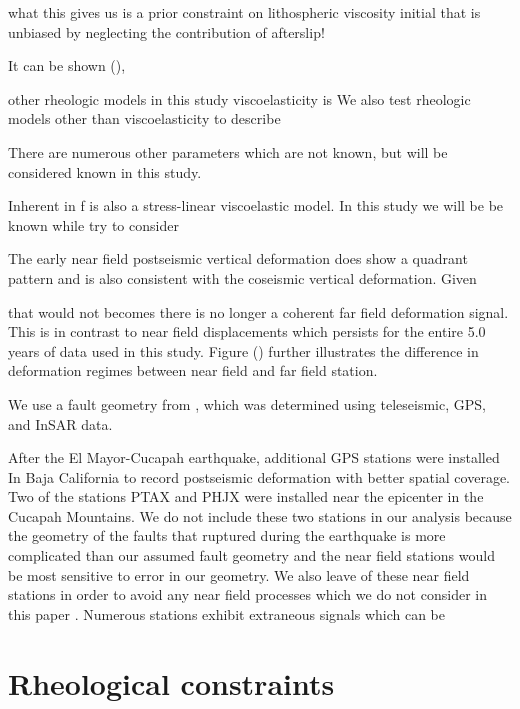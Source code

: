 \documentclass[12pt]{article}
\begin{document}
what this gives us is a prior constraint on lithospheric viscosity initial that is unbiased by neglecting the contribution of afterslip! 


It can be shown (\cite{Hines2015}),     

other rheologic models in this study      viscoelasticity is We also test rheologic models other than viscoelasticity to describe    




There are numerous other parameters which are not known, but will be considered known in this study.   


   Inherent in f is also a stress-linear viscoelastic model.   In this study we will be be known while try to consider             

    

   The early near field postseismic vertical deformation does show a quadrant pattern and is also consistent with the coseismic vertical deformation.  Given         

that would not becomes there is no longer a coherent far field deformation signal. This is in contrast to near field displacements which persists for the entire 5.0 years of data used in this study. Figure () further illustrates the difference in deformation regimes between near field and far field station.  



We use a fault geometry from \cite{Wei2011}, which was determined using teleseismic, GPS, and InSAR data.  

After the El Mayor-Cucapah earthquake, additional GPS stations were installed In Baja California to record postseismic deformation with better spatial coverage.  Two of the stations PTAX and PHJX were installed near the epicenter in the Cucapah Mountains.  We do not include these two stations in our analysis because the geometry of the faults that ruptured during the earthquake is more complicated than our assumed fault geometry \cite{Oskin2012} \cite{Fletcher2014} and the near field stations would be most sensitive to error in our geometry. We also leave of these near field stations in order to avoid any near field processes which we do not consider in this paper \cite{Gonzalez-ortega2014}. Numerous stations exhibit extraneous signals which can be 

\section*{Rheological constraints}
\end{document}
